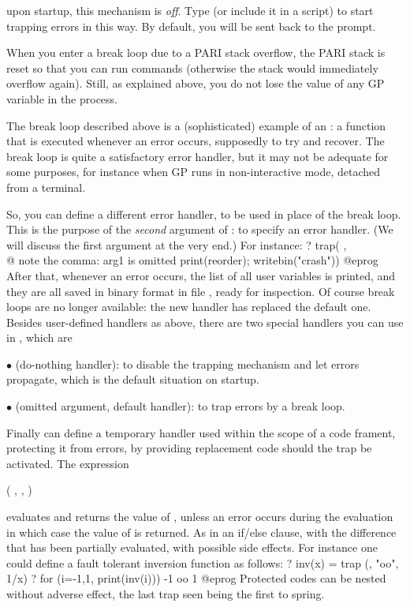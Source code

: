  upon startup, this mechanism is \emph{off}. Type 
 (or include it in a script) to start trapping errors in this
way. By default, you will be sent back to the prompt.

 When you enter a break loop due to a PARI stack
overflow, the PARI stack is reset so that you can run commands (otherwise the
stack would immediately overflow again). Still, as explained above, you do
not lose the value of any GP variable in the process.


The break loop described above is a (sophisticated) example of an : a function that is executed whenever an error occurs, supposedly to
try and recover. The break loop is quite a satisfactory error handler, but it
may not be adequate for some purposes, for instance when GP runs in
non-interactive mode, detached from a terminal.

So, you can define a different error handler, to be used in place of the
break loop. This is the purpose of the \emph{second} argument of :
to specify an error handler. (We will discuss the first argument at the very
end.) For instance:
\bprog
? { trap( ,                \\@ note the comma: arg1 is omitted
      print(reorder);
      writebin("crash")) }
@eprog
\noindent After that, whenever an error occurs, the list of all user
variables is printed, and they are all saved in binary format in file
, ready for inspection. Of course break loops are no longer
available: the new handler has replaced the default one. Besides user-defined
handlers as above, there are two special handlers you can use in ,
which are 

$\bullet$  (do-nothing handler): to disable the trapping
mechanism and let errors propagate, which is the default situation on
startup.

$\bullet$   (omitted argument, default handler): to trap errors
by a break loop.

Finally  can define a temporary handler used within the scope of a
code frament, protecting it from errors, by providing replacement code should
the trap be activated. The expression

  ( , , )

\noindent evaluates and returns the value of , unless an
error occurs during the evaluation in which case the value of 
is returned. As in an if/else clause, with the difference that
 has been partially evaluated, with possible side effects.
For instance one could define a fault tolerant inversion function as follows:
\bprog
? inv(x) = trap (, "oo", 1/x)
? for (i=-1,1, print(inv(i)))
-1
oo
1
@eprog
\noindent Protected codes can be nested without adverse effect, the last trap
seen being the first to spring.

